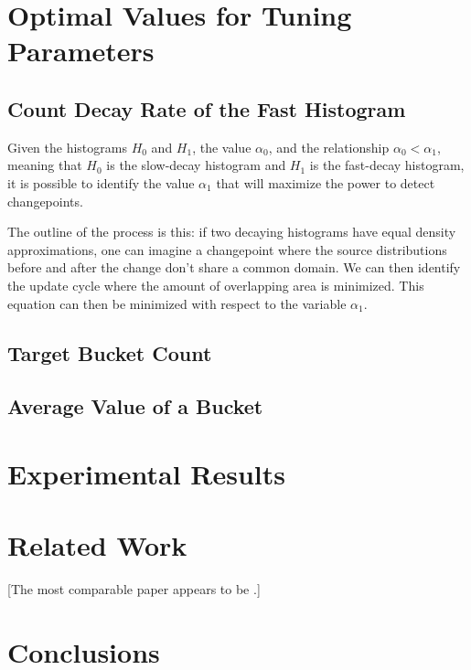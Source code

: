 \documentclass{sig-alternate}
\begin{document}
\section{Optimal Values for Tuning Parameters}
\label{sec:optimalTuningParameters}
\subsection{Count Decay Rate of the Fast Histogram}
    Given the histograms $H_0$ and $H_1$, the value $\alpha_0$, and the
    relationship ${\alpha_0 < \alpha_1}$, meaning that $H_0$ is the slow-decay
    histogram and $H_1$ is the fast-decay histogram, it is possible to identify
    the value $\alpha_1$ that will maximize the power to detect changepoints.

    The outline of the process is this: if two decaying histograms have
    equal density approximations, one can imagine a changepoint where the
    source distributions before and after the change don't share a common
    domain. We can then identify the update cycle where the amount of
    overlapping area is minimized. This equation can then be minimized with
    respect to the variable $\alpha_1$.



\subsection{Target Bucket Count}
\subsection{Average Value of a Bucket}

\section{Experimental Results}

\section{Related Work}
    [The most comparable paper appears to be \cite{kifer2004detecting}.]

\section{Conclusions}



\end{document}
